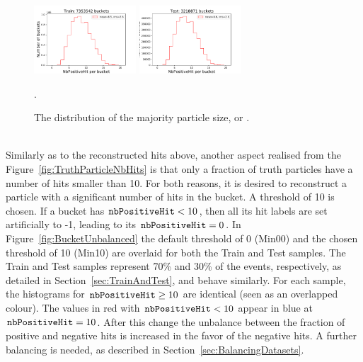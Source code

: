 \begin{figure}[htb]
\centering
\includegraphics[width=0.34\textwidth]{plots/plot_bucket_unbalanced_Train_2.pdf}
\includegraphics[width=0.34\textwidth]{plots/plot_bucket_unbalanced_Test_2.pdf}
\caption{The distribution of the majority particle size, or \nbPositiveHit.}
\label{fig:BucketNbPositiveHit}.
\end{figure}

\ \\Similarly as to the reconstructed hits above, another aspect realised from the Figure~\ref{fig:TruthParticleNbHits} is that only a fraction of truth particles have a number of hits smaller than 10. For both reasons, it is desired to reconstruct a particle with a significant number of hits in the bucket. A threshold of 10 is chosen. If a bucket has $\nbPositiveHit < 10$, then all its hit labels are set artificially to -1, leading to its $\nbPositiveHit=0$. In Figure~\ref{fig:BucketUnbalanced} the default threshold of 0 (Min00) and the chosen threshold of 10 (Min10) are overlaid for both the Train and Test samples. The Train and Test samples represent 70\% and 30\% of the events, respectively, as detailed in Section~\ref{sec:TrainAndTest}, and behave similarly. For each sample, the histograms for $\nbPositiveHit \ge 10$ are identical (seen as an overlapped colour). The values in red with  $\nbPositiveHit < 10$ appear in blue at $\nbPositiveHit = 10$. After this change the unbalance between the fraction of positive and negative hits is increased in the favor of the negative hits. A further balancing is needed, as described in Section~\ref{sec:BalancingDatasets}. 

